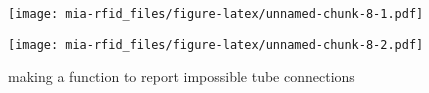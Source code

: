 \documentclass[
]{article}
\newenvironment{Shaded}{\begin{snugshade}}{\end{snugshade}}
\newcommand{\KeywordTok}[1]{\textcolor[rgb]{0.13,0.29,0.53}{\textbf{#1}}}
\newcommand{\NormalTok}[1]{#1}
\newcommand{\OperatorTok}[1]{\textcolor[rgb]{0.81,0.36,0.00}{\textbf{#1}}}
\begin{document}
\begin{Shaded}
\end{Shaded}

\texttt{[image: mia-rfid\_files/figure-latex/unnamed-chunk-8-1.pdf]}

\begin{Shaded}
\end{Shaded}

\texttt{[image: mia-rfid\_files/figure-latex/unnamed-chunk-8-2.pdf]}

making a function to report impossible tube connections
\end{document}
